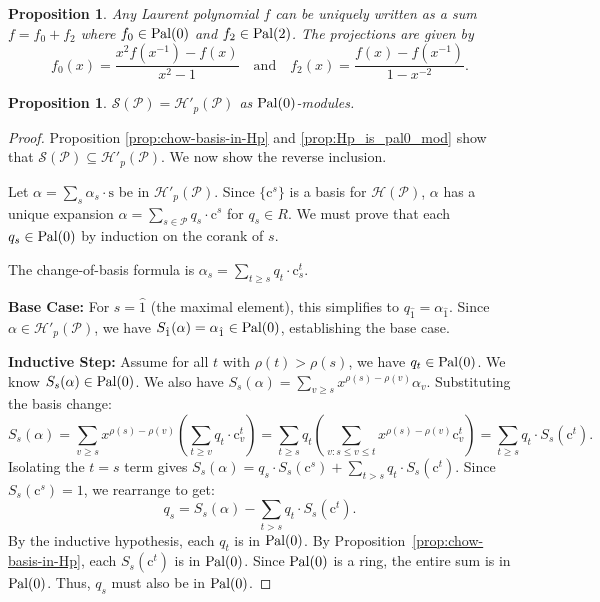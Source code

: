 \documentclass[11pt, letterpaper, english]{amsart}
\theoremstyle{teoremas}
\newtheorem{proposition}[theorem]{Proposition}
\theoremstyle{definition}
\newcommand{\calP}{\mathcal{P}}
\newcommand{\calH}{\mathcal{H}}
\newcommand{\calS}{\mathcal{S}}
\newcommand{\Ebasis}[1]{\mathrm{#1}}
\newcommand{\Cbasis}[1]{\mathrm{c}^{#1}}
\newcommand{\CbasisSub}[2]{\mathrm{c}^{#1}_{#2}}
\newcommand{\pal}{\normalfont\text{Pal}}
\begin{document}
\begin{proposition}\label{prop:LPDecomposition}
    Any Laurent polynomial \(f\) can be uniquely written as a sum \(f = f_0 + f_2\) where
    \(f_0 \in \pal(0)\) and \(f_2 \in \pal(2)\). The projections are given by
    \[ f_0(x) = \frac{x^2 f(x^{-1}) - f(x)}{x^2 - 1} \quad \text{and}
        \quad f_2(x) = \frac{f(x) - f(x^{-1})}{1 - x^{-2}}. \]
\end{proposition}

\begin{proposition}\label{prop:SisHp}
    \(\calS(\calP) = \calH'_p(\calP)\) as \(\pal(0)\)-modules.
\end{proposition}
\begin{proof}
    Proposition \ref{prop:chow-basis-in-Hp} and \ref{prop:Hp_is_pal0_mod}
    show that \(\calS(\calP) \subseteq \calH'_p(\calP)\). We now show the reverse inclusion.

    Let \(\alpha = \sum_s \alpha_s \cdot \Ebasis{s}\) be in \(\mathcal{H}'_p(\calP)\). Since \(\{\Cbasis{s}\}\) is a basis for \(\mathcal{H}(\calP)\), \(\alpha\) has a unique expansion \(\alpha = \sum_{s \in \calP} q_s \cdot \Cbasis{s}\) for \(q_s \in R\). We must prove that each \(q_s \in \pal(0)\) by induction on the corank of \(s\).

    The change-of-basis formula is \(\alpha_s = \sum_{t \ge s} q_t \cdot \CbasisSub{t}{s}\).

    \textbf{Base Case:} For \(s=\hat{1}\) (the maximal element), this simplifies to \(q_{\hat{1}} = \alpha_{\hat{1}}\). Since \(\alpha \in \mathcal{H}'_p(\calP)\), we have \(S_{\hat{1}}(\alpha) = \alpha_{\hat{1}} \in \pal(0)\), establishing the base case.

    \textbf{Inductive Step:} Assume for all \(t\) with \(\rho(t) > \rho(s)\), we have \(q_t \in \pal(0)\).
    We know \(S_s(\alpha) \in \pal(0)\). We also have \(S_s(\alpha) = \sum_{v \ge s} x^{\rho(s)-\rho(v)} \alpha_v\). Substituting the basis change:
    \[ S_s(\alpha) = \sum_{v \ge s} x^{\rho(s)-\rho(v)} \left( \sum_{t \ge v} q_t \cdot \CbasisSub{t}{v} \right)
        = \sum_{t \ge s} q_t \left( \sum_{v: s \le v \le t} x^{\rho(s)-\rho(v)} \CbasisSub{t}{v} \right)
        = \sum_{t \ge s} q_t \cdot S_s(\Cbasis{t}). \]
    Isolating the \(t=s\) term gives \(S_s(\alpha) = q_s \cdot S_s(\Cbasis{s}) + \sum_{t > s} q_t \cdot S_s(\Cbasis{t})\). Since \(S_s(\Cbasis{s})=1\), we rearrange to get:
    \[ q_s = S_s(\alpha) - \sum_{t > s} q_t \cdot S_s(\Cbasis{t}). \]
    By the inductive hypothesis, each \(q_t\) is in \(\pal(0)\). By Proposition~\ref{prop:chow-basis-in-Hp}, each \(S_s(\Cbasis{t})\) is in \(\pal(0)\). Since \(\pal(0)\) is a ring, the entire sum is in \(\pal(0)\). Thus, \(q_s\) must also be in \(\pal(0)\).
\end{proof}
\end{document}

